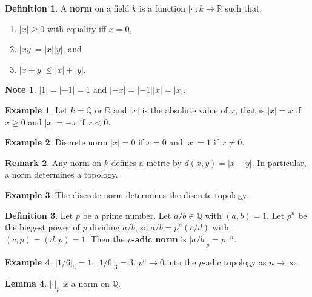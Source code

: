 \documentclass{article}
\newcommand{\Q}{\mathbb{Q}}
\newcommand{\R}{\mathbb{R}}
\newcommand{\rb}[1]{\left( #1 \right)}
\newcommand{\abs}[1]{\left\lvert #1 \right\rvert}
\theoremstyle{definition}\newtheorem{definition}{Definition}[section]
\theoremstyle{definition}\newtheorem{remark}[definition]{Remark}
\theoremstyle{definition}\newtheorem*{example}{Example}
\theoremstyle{definition}\newtheorem*{note}{Note}
\newtheorem{lemma}[definition]{Lemma}
\begin{document}
\begin{definition}
A \textbf{norm} on a field $ k $ is a function $ \abs{\cdot} : k \to \R $ such that:
\begin{enumerate}
\item $ \abs{x} \ge 0 $ with equality iff $ x = 0 $,
\item $ \abs{xy} = \abs{x}\abs{y} $, and
\item $ \abs{x + y} \le \abs{x} + \abs{y} $.
\end{enumerate}
\end{definition}

\begin{note}
$ \abs{1} = \abs{-1} = 1 $ and $ \abs{-x} = \abs{-1}\abs{x} = \abs{x} $.
\end{note}

\begin{example}
Let $ k = \Q $ or $ \R $ and $ \abs{x} $ is the absolute value of $ x $, that is $ \abs{x} = x $ if $ x \ge 0 $ and $ \abs{x} = -x $ if $ x < 0 $.
\end{example}

\begin{example}
Discrete norm $ \abs{x} = 0 $ if $ x = 0 $ and $ \abs{x} = 1 $ if $ x \ne 0 $.
\end{example}

\begin{remark}
Any norm on $ k $ defines a metric by $ d\rb{x, y} = \abs{x - y} $. In particular, a norm determines a topology.
\end{remark}

\begin{example}
The discrete norm determines the discrete topology.
\end{example}

\begin{definition}
Let $ p $ be a prime number. Let $ a / b \in \Q $ with $ \rb{a, b} = 1 $. Let $ p^n $ be the biggest power of $ p $ dividing $ a / b $, so $ a / b = p^n \rb{c / d} $ with $ \rb{c, p} = \rb{d, p} = 1 $. Then the \textbf{$ p $-adic norm} is $ \abs{a / b}_p = p^{-n} $.
\end{definition}

\begin{example}
$ \abs{1 / 6}_5 = 1 $, $ \abs{1 / 6}_3 = 3 $. $ p^n \to 0 $ into the $ p $-adic topology as $ n \to \infty $.
\end{example}

\begin{lemma}
$ \abs{\cdot}_p $ is a norm on $ \Q $.
\end{lemma}
\end{document}
